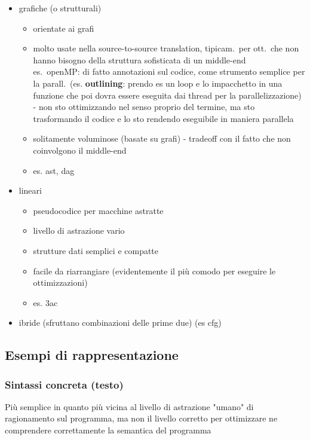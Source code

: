 \begin{itemize}
  \item grafiche (o strutturali)
    \begin{itemize}
      \item orientate ai grafi
      \item molto usate nella source-to-source translation, tipicam.~per ott.~che non hanno bisogno della struttura sofisticata di un middle-end\\
      es.~openMP: di fatto annotazioni sul codice, come strumento semplice per la parall.~(es. \textbf{outlining}: prendo es un loop e lo impacchetto in una funzione che poi dovra essere eseguita dai thread per la parallelizzazione) - non sto ottimizzando nel senso proprio del termine, ma sto trasformando il codice e lo sto rendendo eseguibile in maniera parallela
      \item solitamente voluminose (basate su grafi) - tradeoff con il fatto che non coinvolgono il middle-end
      \item es. ast, dag
    \end{itemize}
  \item lineari
    \begin{itemize}
      \item pseudocodice per macchine astratte
      \item livello di astrazione vario
      \item strutture dati semplici e compatte
      \item facile da riarrangiare (evidentemente il pi\`u comodo per eseguire le ottimizzazioni)
      \item es. 3ac
    \end{itemize}
  \item ibride (sfruttano combinazioni delle prime due) (es cfg)
\end{itemize}
\subsection{Esempi di rappresentazione}


\subsubsection{Sintassi concreta (testo)}

Pi\`u semplice in quanto pi\`u vicina al livello di astrazione "umano" di ragionamento sul programma, ma non il livello corretto per ottimizzare ne comprendere correttamente la semantica del programma

